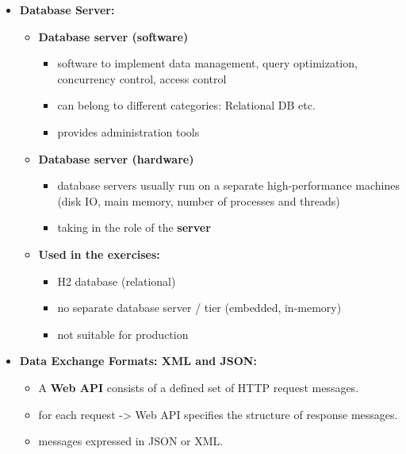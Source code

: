 \documentclass[ieeetran]{article}
\begin{document}
\begin{itemize}
\item \textbf{Database Server:}
	\begin{itemize}
	  \item \textbf{Database server (software)}
		  \begin{itemize}
		    \item software to implement data management, query optimization, concurrency control, access control
		\item can belong to different categories: Relational DB etc.
		\item provides administration tools
		  \end{itemize}

	\item \textbf{Database server (hardware)}
		\begin{itemize}
		  \item database servers usually run on a separate high-performance machines (disk IO, main memory, number of processes and threads)
		\item taking in the role of the \textbf{server}
		\end{itemize}

	\item \textbf{Used in the exercises:}
		\begin{itemize}
		  \item H2 database (relational)
		\item no separate database server / tier (embedded, in-memory)
		\item not suitable for production
		\end{itemize}
	\end{itemize}
\pagebreak
\item \textbf{Data Exchange Formats: XML and JSON:}
\begin{itemize}
  \item A \textbf{Web API} consists of a defined set of HTTP request messages.
\item for each request -> Web API specifies the structure of response messages.
\item messages expressed in JSON or XML.
\end{itemize}
\end{itemize}


\end{document}
